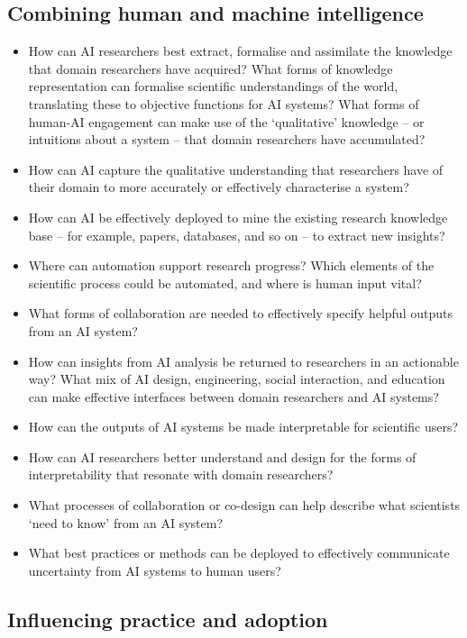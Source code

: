 \subsection*{Combining human and machine intelligence}

\begin{itemize}
\item
  How can AI researchers best extract, formalise and assimilate the
  knowledge that domain researchers have acquired? What forms of
  knowledge representation can formalise scientific understandings of
  the world, translating these to objective functions for AI systems?
  What forms of human-AI engagement can make use of the `qualitative'
  knowledge -- or intuitions about a system -- that domain researchers
  have accumulated?
\item
  How can AI capture the qualitative understanding that researchers have
  of their domain to more accurately or effectively characterise a
  system?
\item
  How can AI be effectively deployed to mine the existing research
  knowledge base -- for example, papers, databases, and so on -- to
  extract new insights?
\item
  Where can automation support research progress? Which elements of the
  scientific process could be automated, and where is human input vital?
\item
  What forms of collaboration are needed to effectively specify helpful
  outputs from an AI system?
\item
  How can insights from AI analysis be returned to researchers in an
  actionable way? What mix of AI design, engineering, social
  interaction, and education can make effective interfaces between
  domain researchers and AI systems?
\item
  How can the outputs of AI systems be made interpretable for scientific
  users?
\item
  How can AI researchers better understand and design for the forms of
  interpretability that resonate with domain researchers?
\item
  What processes of collaboration or co-design can help describe what
  scientists `need to know' from an AI system?
\item
  What best practices or methods can be deployed to effectively
  communicate uncertainty from AI systems to human users?
\end{itemize}

\subsection{Influencing practice and adoption}

